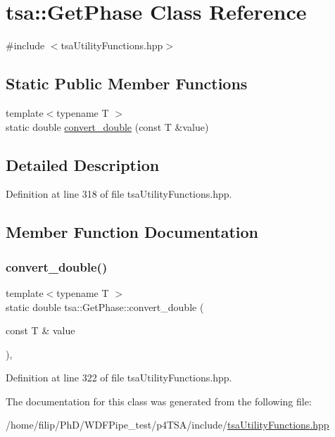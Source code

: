 \hypertarget{classtsa_1_1_get_phase}{}\section{tsa\+:\+:Get\+Phase Class Reference}
\label{classtsa_1_1_get_phase}


{\ttfamily \#include $<$tsa\+Utility\+Functions.\+hpp$>$}

\subsection*{Static Public Member Functions}
\begin{DoxyCompactItemize}
\item 
{\footnotesize template$<$typename T $>$ }\\static double \hyperlink{classtsa_1_1_get_phase_a5682cc958913a5ac9237b3bb1b64f551}{convert\+\_\+double} (const T \&value)
\end{DoxyCompactItemize}


\subsection{Detailed Description}


Definition at line 318 of file tsa\+Utility\+Functions.\+hpp.



\subsection{Member Function Documentation}
\mbox{\label{classtsa_1_1_get_phase_a5682cc958913a5ac9237b3bb1b64f551}} 
\subsubsection{\texorpdfstring{convert\+\_\+double()}{convert\_double()}}
{\footnotesize\ttfamily template$<$typename T $>$ \\
static double tsa\+::\+Get\+Phase\+::convert\+\_\+double (\begin{DoxyParamCaption}\item[{const T \&}]{value }\end{DoxyParamCaption})\hspace{0.3cm}{\ttfamily [inline]}, {\ttfamily [static]}}



Definition at line 322 of file tsa\+Utility\+Functions.\+hpp.



The documentation for this class was generated from the following file\+:\begin{DoxyCompactItemize}
\item 
/home/filip/\+Ph\+D/\+W\+D\+F\+Pipe\+\_\+test/p4\+T\+S\+A/include/\hyperlink{tsa_utility_functions_8hpp}{tsa\+Utility\+Functions.\+hpp}\end{DoxyCompactItemize}
